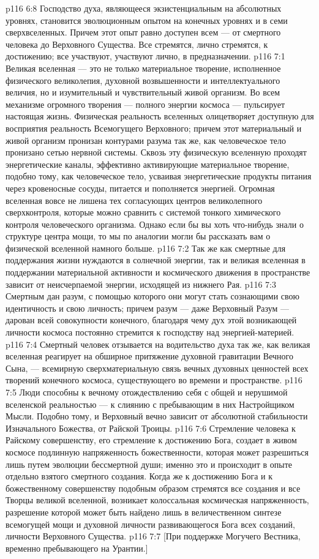 \vs p116 6:8 Господство духа, являющееся экзистенциальным на абсолютных уровнях, становится эволюционным опытом на конечных уровнях и в семи сверхвселенных. Причем этот опыт равно доступен всем --- от смертного человека до Верховного Существа. Все стремятся, лично стремятся, к достижению; все участвуют, участвуют лично, в предназначении.
\vs p116 7:1 Великая вселенная --- это не только материальное творение, исполненное физического великолепия, духовной возвышенности и интеллектуального величия, но и изумительный и чувствительный живой организм. Во всем механизме огромного творения --- полного энергии космоса --- пульсирует настоящая жизнь. Физическая реальность вселенных олицетворяет доступную для восприятия реальность Всемогущего Верховного; причем этот материальный и живой организм пронизан контурами разума так же, как человеческое тело пронизано сетью нервной системы. Сквозь эту физическую вселенную проходят энергетические каналы, эффективно активирующие материальное творение, подобно тому, как человеческое тело, усваивая энергетические продукты питания через кровеносные сосуды, питается и пополняется энергией. Огромная вселенная вовсе не лишена тех согласующих центров великолепного сверхконтроля, которые можно сравнить с системой тонкого химического контроля человеческого организма. Однако если бы вы хоть что\hyp{}нибудь знали о структуре центра мощи, то мы по аналогии могли бы рассказать вам о физической вселенной намного больше.
\vs p116 7:2 Так же как смертные для поддержания жизни нуждаются в солнечной энергии, так и великая вселенная в поддержании материальной активности и космического движения в пространстве зависит от неисчерпаемой энергии, исходящей из нижнего Рая.
\vs p116 7:3 Смертным дан разум, с помощью которого они могут стать сознающими свою идентичность и свою личность; причем разум --- даже Верховный Разум --- дарован всей совокупности конечного, благодаря чему дух этой возникающей личности космоса постоянно стремится к господству над энергией\hyp{}материей.
\vs p116 7:4 Смертный человек отзывается на водительство духа так же, как великая вселенная реагирует на обширное притяжение духовной гравитации Вечного Сына, --- всемирную сверхматериальную связь вечных духовных ценностей всех творений конечного космоса, существующего во времени и пространстве.
\vs p116 7:5 Люди способны к вечному отождествлению себя с общей и нерушимой вселенской реальностью --- к слиянию с пребывающим в них Настройщиком Мысли. Подобно тому, и Верховный вечно зависит от абсолютной стабильности Изначального Божества, от Райской Троицы.
\vs p116 7:6 Стремление человека к Райскому совершенству, его стремление к достижению Бога, создает в живом космосе подлинную напряженность божественности, которая может разрешиться лишь путем эволюции бессмертной души; именно это и происходит в опыте отдельно взятого смертного создания. Когда же к достижению Бога и к божественному совершенству подобным образом стремятся все создания и все Творцы великой вселенной, возникает колоссальная космическая напряженность, разрешение которой может быть найдено лишь в величественном синтезе всемогущей мощи и духовной личности развивающегося Бога всех созданий, личности Верховного Существа.
\vs p116 7:7 [При поддержке Могучего Вестника, временно пребывающего на Урантии.]
